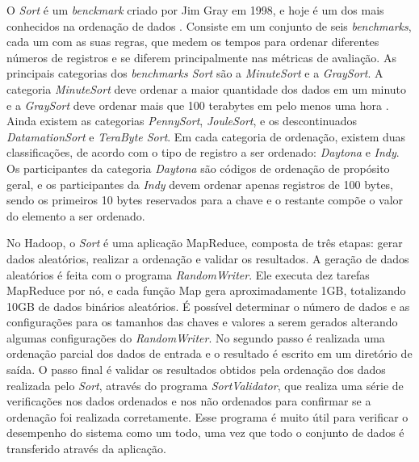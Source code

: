 O \textit{Sort} é um \textit{benckmark} criado por Jim Gray em 1998, e hoje é um dos mais conhecidos na ordenação de dados \cite{Gray:1998}. 
Consiste em um conjunto de seis \textit{benchmarks}, cada um com as suas regras, que medem os tempos para ordenar diferentes números de registros e se diferem principalmente nas métricas de avaliação. 
As principais categorias dos \textit{benchmarks Sort} são a \textit{MinuteSort} e a \textit{GraySort}. A categoria \textit{MinuteSort} deve ordenar a maior quantidade dos dados em um minuto e a \textit{GraySort} deve ordenar mais que 100 terabytes em pelo menos uma hora \cite{White:2009}. Ainda existem as categorias \textit{PennySort}, \textit{JouleSort}, e os descontinuados  \textit{DatamationSort} e \textit{TeraByte Sort}. 
Em cada categoria de ordenação, existem duas classificações, de acordo com o tipo de registro a ser ordenado: \textit{Daytona} e \textit{Indy}. Os participantes da categoria \textit{Daytona} são códigos de ordenação de propósito geral, e os participantes da \textit{Indy} devem ordenar apenas registros de 100 bytes, sendo os primeiros 10 bytes reservados para a chave e o restante compõe o valor do elemento a ser ordenado.


No Hadoop, o \textit{Sort} é uma aplicação MapReduce, composta de três etapas: gerar dados aleatórios, realizar a ordenação e validar os resultados.
A geração de dados aleatórios é feita com o programa \textit{RandomWriter}. Ele executa dez tarefas MapReduce por nó, e cada função Map gera aproximadamente 1GB,  totalizando 10GB de dados binários aleatórios. 
É possível determinar o número de dados e as configurações para os tamanhos das chaves e valores a serem gerados alterando algumas configurações do \textit{RandomWriter}.
No segundo passo é realizada uma ordenação parcial dos dados de entrada e  o resultado é escrito em um diretório de saída. 
O passo final é validar os resultados obtidos pela ordenação dos dados realizada pelo \textit{Sort}, através do programa \textit{SortValidator}, que realiza uma série de verificações nos dados ordenados e nos não ordenados para confirmar se a ordenação foi realizada corretamente. 
Esse programa é muito útil para verificar o desempenho do sistema como um todo, uma vez que todo o conjunto de dados é transferido através da aplicação.

